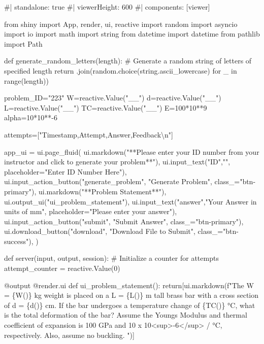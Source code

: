\documentclass[
  letterpaper,
  DIV=11,
  numbers=noendperiod]{scrreprt}
\newenvironment{Shaded}{\begin{snugshade}}{\end{snugshade}}
\newcommand{\NormalTok}[1]{\textcolor[rgb]{0.00,0.23,0.31}{#1}}
\begin{document}
\begin{Shaded}
\begin{Highlighting}[]
\NormalTok{\#| standalone: true}
\NormalTok{\#| viewerHeight: 600}
\NormalTok{\#| components: [viewer]}

\NormalTok{from shiny import App, render, ui, reactive}
\NormalTok{import random}
\NormalTok{import asyncio}
\NormalTok{import io}
\NormalTok{import math}
\NormalTok{import string}
\NormalTok{from datetime import datetime}
\NormalTok{from pathlib import Path}

\NormalTok{def generate\_random\_letters(length):}
\NormalTok{    \# Generate a random string of letters of specified length}
\NormalTok{    return \textquotesingle{}\textquotesingle{}.join(random.choice(string.ascii\_lowercase) for \_ in range(length)) }

\NormalTok{problem\_ID="223"}
\NormalTok{W=reactive.Value("\_\_")}
\NormalTok{d=reactive.Value("\_\_")}
\NormalTok{L=reactive.Value("\_\_")}
\NormalTok{TC=reactive.Value("\_\_")}
\NormalTok{E=100*10**9}
\NormalTok{alpha=10*10**{-}6}

\NormalTok{attempts=["Timestamp,Attempt,Answer,Feedback\textbackslash{}n"]}

\NormalTok{app\_ui = ui.page\_fluid(}
\NormalTok{    ui.markdown("**Please enter your ID number from your instructor and click to generate your problem**"),}
\NormalTok{    ui.input\_text("ID","", placeholder="Enter ID Number Here"),}
\NormalTok{    ui.input\_action\_button("generate\_problem", "Generate Problem", class\_="btn{-}primary"),}
\NormalTok{    ui.markdown("**Problem Statement**"),}
\NormalTok{    ui.output\_ui("ui\_problem\_statement"),}
\NormalTok{    ui.input\_text("answer","Your Answer in units of mm", placeholder="Please enter your answer"),}
\NormalTok{    ui.input\_action\_button("submit", "Submit Answer", class\_="btn{-}primary"),}
\NormalTok{    ui.download\_button("download", "Download File to Submit", class\_="btn{-}success"),}
\NormalTok{)}


\NormalTok{def server(input, output, session):}
\NormalTok{    \# Initialize a counter for attempts}
\NormalTok{    attempt\_counter = reactive.Value(0)}

\NormalTok{    @output}
\NormalTok{    @render.ui}
\NormalTok{    def ui\_problem\_statement():}
\NormalTok{        return[ui.markdown(f"The W = \{W()\} kg weight is placed on a L = \{L()\} m tall brass bar with a cross section of d = \{d()\} cm. If the bar undergoes a temperature change of \{TC()\} °C, what is the total deformation of the bar? Assume the Young\textquotesingle{}s Modulus and thermal coefficient of expansion is 100 GPa and 10 x 10\textless{}sup\textgreater{}{-}6\textless{}/sup\textgreater{} / °C, respectively. Also, assume no buckling. ")]}
    

\end{Highlighting}
\end{Shaded}
\end{document}
